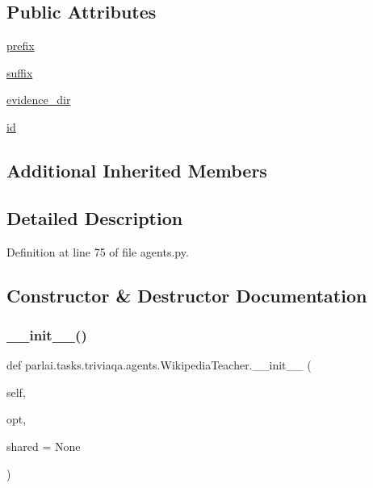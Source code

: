 \subsection*{Public Attributes}
\begin{DoxyCompactItemize}
\item 
\hyperlink{classparlai_1_1tasks_1_1triviaqa_1_1agents_1_1WikipediaTeacher_a5b37aa1d9fc169e9daeb33ebcaa1f259}{prefix}
\item 
\hyperlink{classparlai_1_1tasks_1_1triviaqa_1_1agents_1_1WikipediaTeacher_aff5be8d4af8ead80a67963cdfe9a7f08}{suffix}
\item 
\hyperlink{classparlai_1_1tasks_1_1triviaqa_1_1agents_1_1WikipediaTeacher_ae361f0f221fa8d8aa814d68dfcd30e25}{evidence\+\_\+dir}
\item 
\hyperlink{classparlai_1_1tasks_1_1triviaqa_1_1agents_1_1WikipediaTeacher_af8a1bc2da82beacd3b734238d8e2f955}{id}
\end{DoxyCompactItemize}
\subsection*{Additional Inherited Members}


\subsection{Detailed Description}


Definition at line 75 of file agents.\+py.



\subsection{Constructor \& Destructor Documentation}
\mbox{\label{classparlai_1_1tasks_1_1triviaqa_1_1agents_1_1WikipediaTeacher_a8f98e896d67718624f8304ad03a08def}} 
\subsubsection{\texorpdfstring{\+\_\+\+\_\+init\+\_\+\+\_\+()}{\_\_init\_\_()}}
{\footnotesize\ttfamily def parlai.\+tasks.\+triviaqa.\+agents.\+Wikipedia\+Teacher.\+\_\+\+\_\+init\+\_\+\+\_\+ (\begin{DoxyParamCaption}\item[{}]{self,  }\item[{}]{opt,  }\item[{}]{shared = {\ttfamily None} }\end{DoxyParamCaption})}



